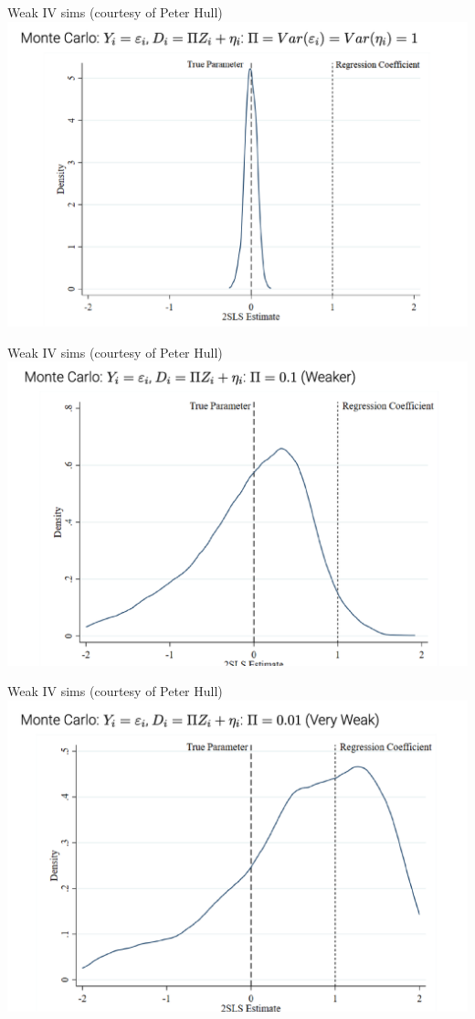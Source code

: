 \documentclass[notes,11pt, aspectratio=169]{beamer}
\begin{document}
\begin{frame}{Weak IV sims (courtesy of Peter Hull)}
\includegraphics[width=0.7\linewidth]{images/weakiv_hull1.png}
\end{frame}
\begin{frame}{Weak IV sims (courtesy of Peter Hull)}
\includegraphics[width=0.7\linewidth]{images/weakiv_hull2.png}
\end{frame}
\begin{frame}{Weak IV sims (courtesy of Peter Hull)}
\includegraphics[width=0.7\linewidth]{images/weakiv_hull3.png}
\end{frame}
\end{document}
